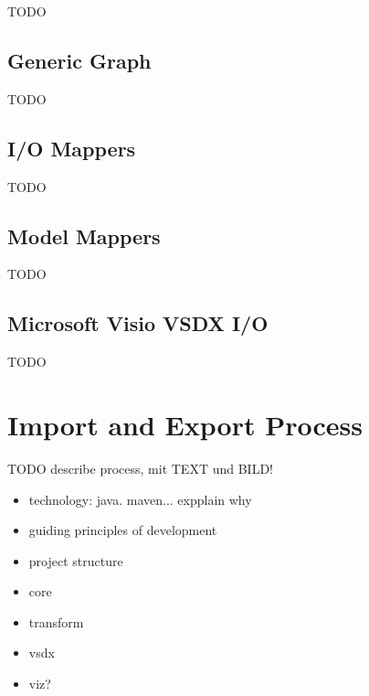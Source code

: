 TODO

\subsection{Generic Graph}

TODO

\subsection{I/O Mappers}

TODO

\subsection{Model Mappers}

TODO

\subsection{Microsoft Visio VSDX I/O}

TODO

\section{Import and Export Process}
\label{sec:impl:process}

TODO describe process, mit TEXT und BILD! 

\begin{itemize}
\item technology: java. maven... expplain why
\item guiding principles of development
\item project structure
\item core
\item transform
\item vsdx
\item viz?
\end{itemize}
